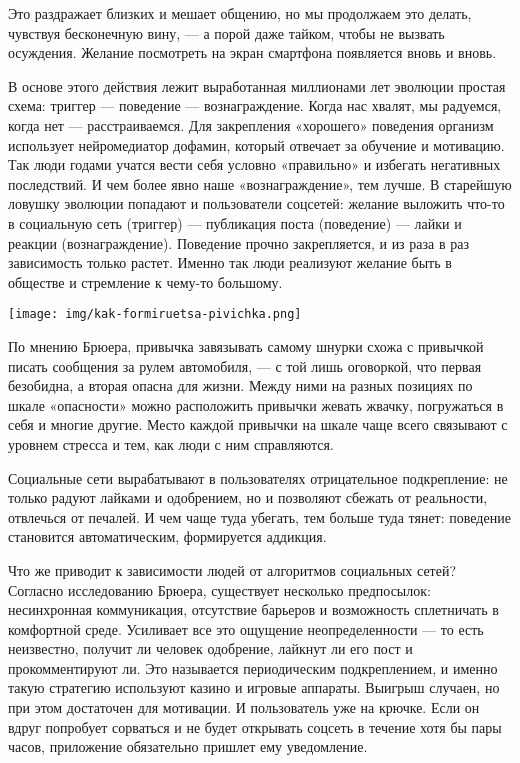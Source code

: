 Это раздражает близких и мешает общению, но мы продолжаем это делать, чувствуя бесконечную вину, — а порой даже тайком, чтобы не вызвать осуждения. Желание посмотреть на экран смартфона появляется вновь и вновь.

В основе этого действия лежит выработанная миллионами лет эволюции простая схема: триггер — поведение — вознаграждение. Когда нас хвалят, мы радуемся, когда нет — расстраиваемся. Для закрепления «хорошего» поведения организм использует нейромедиатор дофамин, который отвечает за обучение и мотивацию. Так люди годами учатся вести себя условно «правильно» и избегать негативных последствий. И чем более явно наше «вознаграждение», тем лучше. В старейшую ловушку эволюции попадают и пользователи соцсетей: желание выложить что-то в социальную сеть (триггер) — публикация поста (поведение) — лайки и реакции (вознаграждение). Поведение прочно закрепляется, и из раза в раз зависимость только растет. Именно так люди реализуют желание быть в обществе и стремление к чему-то большому.

\begin{center}
    \texttt{[image: img/kak-formiruetsa-pivichka.png]}
\end{center}

По мнению Брюера, привычка завязывать самому шнурки схожа с привычкой писать сообщения за рулем автомобиля, — с той лишь оговоркой, что первая безобидна, а вторая опасна для жизни. Между ними на разных позициях по шкале «опасности» можно расположить привычки жевать жвачку, погружаться в себя и многие другие. Место каждой привычки на шкале чаще всего связывают с уровнем стресса и тем, как люди с ним справляются.

\begin{fancyquotes}
    Социальные сети вырабатывают в пользователях отрицательное подкрепление: не только радуют лайками и одобрением, но и позволяют сбежать от реальности, отвлечься от печалей. И чем чаще туда убегать, тем больше туда тянет: поведение становится автоматическим, формируется аддикция.
\end{fancyquotes}

Что же приводит к зависимости людей от алгоритмов социальных сетей? Согласно исследованию Брюера, существует несколько предпосылок: несинхронная коммуникация, отсутствие барьеров и возможность сплетничать в комфортной среде. Усиливает все это ощущение неопределенности — то есть неизвестно, получит ли человек одобрение, лайкнут ли его пост и прокомментируют ли. Это называется периодическим подкреплением, и именно такую стратегию используют казино и игровые аппараты. Выигрыш случаен, но при этом достаточен для мотивации. И пользователь уже на крючке. Если он вдруг попробует сорваться и не будет открывать соцсеть в течение хотя бы пары часов, приложение обязательно пришлет ему уведомление.

